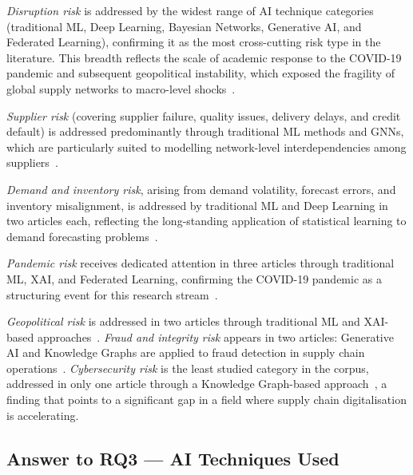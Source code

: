 \textit{Disruption risk} is addressed by the widest range of AI technique categories (traditional ML, Deep Learning, Bayesian Networks, Generative AI, and Federated Learning), confirming it as the most cross-cutting risk type in the literature. This breadth reflects the scale of academic response to the COVID-19 pandemic and subsequent geopolitical instability, which exposed the fragility of global supply networks to macro-level shocks~\cite{li2025endtoend,lin2025generative,nguyen2024federated,fernando2024covid}.

\textit{Supplier risk} (covering supplier failure, quality issues, delivery delays, and credit default) is addressed predominantly through traditional ML methods and GNNs, which are particularly suited to modelling network-level interdependencies among suppliers~\cite{farzhana2025hybrid,yang2024building,kumar2023enhancing,renuga2026ai}.

\textit{Demand and inventory risk}, arising from demand volatility, forecast errors, and inventory misalignment, is addressed by traditional ML and Deep Learning in two articles each, reflecting the long-standing application of statistical learning to demand forecasting problems~\cite{adom2025design,li2025endtoend}.

\textit{Pandemic risk} receives dedicated attention in three articles through traditional ML, XAI, and Federated Learning, confirming the COVID-19 pandemic as a structuring event for this research stream~\cite{nayal2022exploring,nimmy2022explainability,nguyen2024federated}.

\textit{Geopolitical risk} is addressed in two articles through traditional ML and XAI-based approaches~\cite{aldehayyat2025applying,kumar2023enhancing}. \textit{Fraud and integrity risk} appears in two articles: Generative AI and Knowledge Graphs are applied to fraud detection in supply chain operations~\cite{lin2025generative,yang2024building}. \textit{Cybersecurity risk} is the least studied category in the corpus, addressed in only one article through a Knowledge Graph-based approach~\cite{yang2024building}, a finding that points to a significant gap in a field where supply chain digitalisation is accelerating.


\subsection{Answer to RQ3 — AI Techniques Used}


